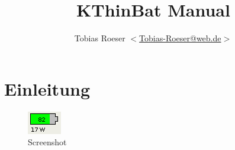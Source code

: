 \documentclass[german]{scrartcl}
\title{KThinBat Manual}
\author{Tobias Roeser $<$\href{mailto:Tobias-Roeser@web.de}{Tobias-Roeser@web.de}$>$}
\begin{document}
\maketitle




\section{Einleitung}

\begin{figure}[H]
	\centering
	\includegraphics{screenshot_1.png}
	\caption{Screenshot}
\end{figure}
\end{document}
